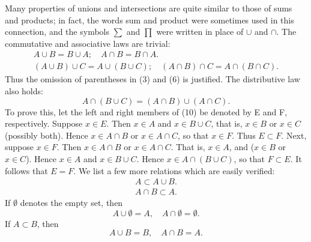 \begin{remark} %
  \label{rem:chap2:union_intersect_props}
  Many properties of unions and intersections are quite similar to
  those of sums and products; in fact, the words sum and product were
  sometimes used in this connection, and the symbols $\sum$ and
  $\prod$ were written in place of $\cup$ and $\cap$.
  The commutative and associative laws are trivial:
  \begin{gather}
    A \cup B = B \cup A; \quad A \cap B = B \cap A. \label{eq:chap2:set_comm} \\
    (A \cup B) \cup C = A \cup (B \cup C); \quad (A \cap B) \cap C =
    A \cap (B \cap C). \label{eq:chap2:set_assoc}
  \end{gather}
  Thus the omission of parentheses in (3) and (6) is justified.
  The distributive law also holds:
  \begin{equation} \label{eq:chap2:set_distrib}
    A \cap (B \cup C) = (A \cap B) \cup (A \cap C).
  \end{equation}
  To prove this, let the left and right members of (10) be denoted by
  E and F, respectively. Suppose $x \in E$. Then $x \in A$ and $x \in
  B \cup C$, that is, $x \in B$ or $x \in C$ (possibly both). Hence
  $x \in A \cap B$ or $x \in A \cap C$, so that $x \in F$. Thus $E \subset F$.
  Next, suppose $x \in F$. Then $x \in A \cap B$ or $x \in A \cap C$.
  That is, $x \in A$, and ($x \in B$ or $x \in C$). Hence $x \in A$
  and $x \in B \cup C$. Hence $x \in A \cap (B \cup C)$, so that $F \subset E$.
  It follows that $E=F$.
  We list a few more relations which are easily verified:
  \begin{gather}
    A \subset A \cup B. \label{eq:chap2:set_subset_union} \\
    A \cap B \subset A. \label{eq:chap2:set_intersect_subset}
  \end{gather}
  If $\emptyset$ denotes the empty set, then
  \begin{equation} \label{eq:chap2:set_empty}
    A \cup \emptyset = A, \quad A \cap \emptyset = \emptyset.
  \end{equation}
  If $A \subset B$, then
  \begin{equation} \label{eq:chap2:set_subset_ops}
    A \cup B = B, \quad A \cap B = A.
  \end{equation}
\end{remark}


